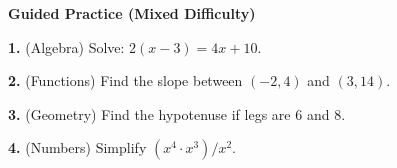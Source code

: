 \documentclass[12pt, letterpaper, fleqn]{article}
\begin{document}
\vspace{4mm}

\begin{tcolorbox}[colback=white!15, colframe=black, boxrule=1.5pt, arc=4mm, left=6mm, right=6mm, top=5mm, bottom=5mm]
\textbf{Guided Practice (Mixed Difficulty)}

\medskip
\textbf{1.} (Algebra) Solve: $2(x-3) = 4x + 10$. \vspace{1.5cm}

\textbf{2.} (Functions) Find the slope between $(-2, 4)$ and $(3, 14)$. \vspace{1.5cm}

\textbf{3.} (Geometry) Find the hypotenuse if legs are $6$ and $8$. \vspace{1.5cm}

\textbf{4.} (Numbers) Simplify $(x^4 \cdot x^3) / x^2$. \vspace{1.5cm}
\end{tcolorbox}
\end{document}
